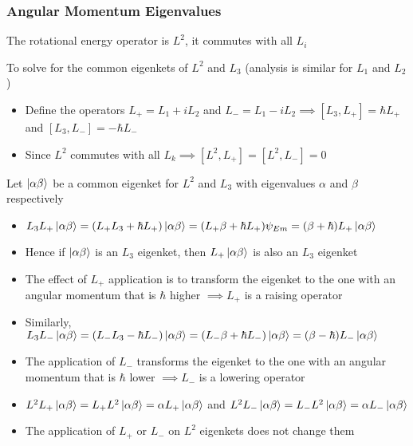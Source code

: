 \documentclass[8pt,t,mathserif,aspectratio=169]{beamer}
\begin{document}
\begin{frame}
  \frametitle{Angular Momentum Eigenvalues}
  \vspace{1mm}
  The rotational energy operator is $L^2$, it commutes with all $L_i$

  To solve for the common eigenkets of $L^2$ and $L_3$ (analysis is similar for $L_1$ and $L_2$)
  \begin{itemize}
    \item Define the operators $L_{+} = L_1 + i L_2$ and $L_{-} = L_1 - i L_2 \implies [L_3,L_{+}] = \hbar L_{+}$ and $[L_3,L_{-}] = -\hbar L_{-}$
    \item Since $L^2$ commutes with all $L_k \implies [L^2,L_{+}] = [L^2,L_{-}] = 0$
  \end{itemize}
  Let $\ket{\alpha \beta}$ be a common eigenket for $L^2$ and $L_3$ with eigenvalues $\alpha$ and $\beta$ respectively 
  \begin{itemize}
    \item $L_3 L_{+} \ket{\alpha \beta} = (L_{+} L_3 + \hbar L_{+}) \ket{\alpha \beta} = (L_{+} \beta + \hbar L_{+}) \psi_{Em} = (\beta + \hbar) L_{+} \ket{\alpha \beta}$
    \item Hence if $\ket{\alpha \beta}$ is an $L_3$ eigenket, then $L_{+} \ket{\alpha \beta}$ is also an $L_3$ eigenket
    \item The effect of $L_{+}$ application is to transform the eigenket to the one with an angular momentum that is $\hbar$ higher $\implies L_{+}$ is a raising operator
    \item Similarly, $L_3 L_{-} \ket{\alpha \beta} = (L_{-} L_3 - \hbar L_{-}) \ket{\alpha \beta} = (L_{-} \beta + \hbar L_{-}) \ket{\alpha \beta} = (\beta - \hbar) L_{-} \ket{\alpha \beta}$
    \item The application of $L_{-}$ transforms the eigenket to the one with an angular momentum that is $\hbar$ lower $\implies L_{-}$ is a lowering operator
    \item $L^2 L_{+} \ket{\alpha \beta} = L_{+} L^2 \ket{\alpha \beta} = \alpha L_{+} \ket{\alpha \beta}$ and $L^2 L_{-} \ket{\alpha \beta} = L_{-} L^2 \ket{\alpha \beta} = \alpha L_{-} \ket{\alpha \beta}$
    \item The application of $L_{+}$ or $L_{-}$ on $L^2$ eigenkets does not change them
  \end{itemize}
\end{frame}
\end{document}
